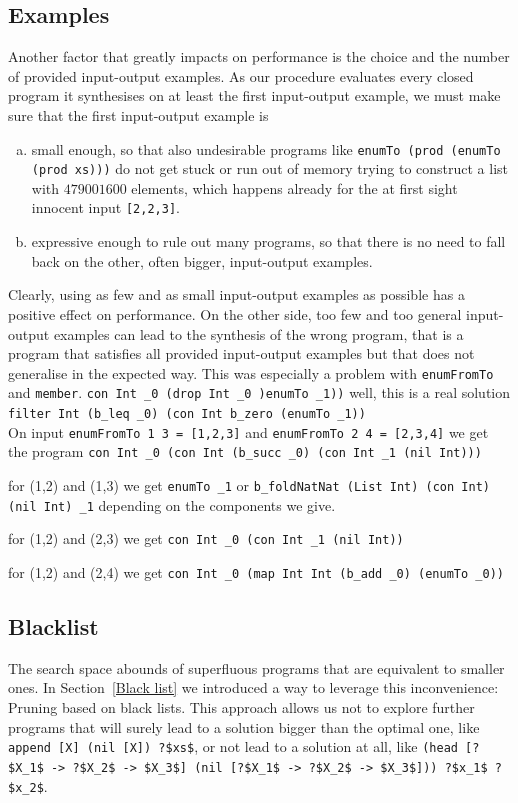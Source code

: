 \subsection{Examples}
Another factor that greatly impacts on performance is the choice and the number of provided input-output examples. As our procedure evaluates every closed program it synthesises on at least the first input-output example, we must make sure that the first input-output example is
\begin{enumerate}[a.]
\item small enough, so that also undesirable programs like \lstinline?enumTo (prod (enumTo (prod xs)))? do not get stuck or run out of memory trying to construct a list with $479001600$ elements, which happens already for the at first sight innocent input \lstinline?[2,2,3]?.
\item expressive enough to rule out many programs, so that there is no need to fall back on the other, often bigger, input-output examples.
\end{enumerate}
Clearly, using as few and as small input-output examples as possible has a positive effect on performance. On the other side, too few and too general input-output examples can lead to the synthesis of the wrong program, that is a program that satisfies all provided input-output examples but that does not generalise in the expected way. This was especially a problem with \lstinline?enumFromTo? and \lstinline?member?.
\lstinline?con Int _0 (drop Int _0 )enumTo _1))? well, this is a real solution\\
\lstinline?filter Int (b_leq _0) (con Int b_zero (enumTo _1))?\\
On input \lstinline?enumFromTo 1 3 = [1,2,3]? and \lstinline?enumFromTo 2 4 = [2,3,4]? we get the program \lstinline?con Int _0 (con Int (b_succ _0) (con Int _1 (nil Int)))?

for (1,2) and (1,3) we get \lstinline?enumTo _1? or \lstinline?b_foldNatNat (List Int) (con Int) (nil Int) _1? depending on the components we give.

for (1,2) and (2,3) we get \lstinline?con Int _0 (con Int _1 (nil Int))?

for (1,2) and (2,4) we get \lstinline?con Int _0 (map Int Int (b_add _0) (enumTo _0))? 

\subsection{Blacklist}
The search space abounds of superfluous programs that are equivalent to smaller ones. In Section~\ref{Black list} we introduced a way to leverage this inconvenience: Pruning based on black lists. This approach allows us not to explore further programs that will surely lead to a solution bigger than the optimal one, like \lstinline!append [X] (nil [X]) ?$xs$!, or not lead to a solution at all, like \lstinline!(head [?$X_1$ -> ?$X_2$ -> $X_3$] (nil [?$X_1$ -> ?$X_2$ -> $X_3$])) ?$x_1$ ?$x_2$!.

